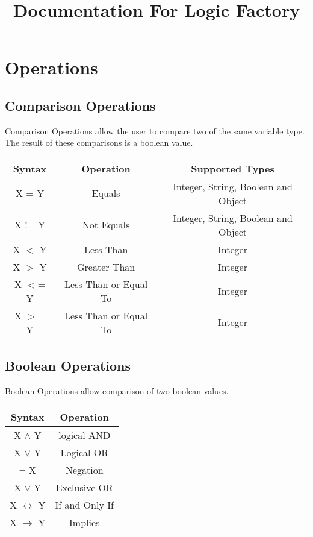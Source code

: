 \documentclass{article}
\title{Documentation For Logic Factory}
\date{ }
\begin{document}
	\maketitle
	\tableofcontents
	\newpage
	
	\section{Operations}
	
	\subsection{Comparison Operations} 

	Comparison Operations allow the user to compare two of the same variable type. The result of these comparisons is a boolean value. \\
	\begin{tabular}{ |c|c|c| } 
		\hline
		\textbf {Syntax} & \textbf{Operation} & \textbf{Supported Types}\\
		\hline
		X = Y & Equals & Integer, String, Boolean and Object \\
		\hline
		X != Y & Not Equals & Integer, String, Boolean and Object\\
		\hline
		X $<$ Y & Less Than & Integer\\
		\hline
		X $>$ Y & Greater Than & Integer\\
		\hline
		X $<$= Y & Less Than or Equal To & Integer \\
		\hline
		X $>$= Y & Less Than or Equal To & Integer\\
		\hline
		 
		
	\end{tabular}

	\subsection{Boolean Operations}
	Boolean Operations allow comparison of two boolean values.  
	
	\begin{tabular}{ |c|c| } 
		\hline
		\textbf {Syntax} & \textbf{Operation}\\
		\hline
		X $\land$ Y & logical AND  \\
		\hline
		X $\lor$ Y & Logical OR \\
		\hline
		$\lnot$ X & Negation \\
		\hline
		X $\veebar$ Y & Exclusive OR \\
		\hline
		X $\leftrightarrow$ Y & If and Only If \\
		\hline
		X $\rightarrow$ Y & Implies \\
		\hline
		
	\end{tabular}
	
\end{document}
